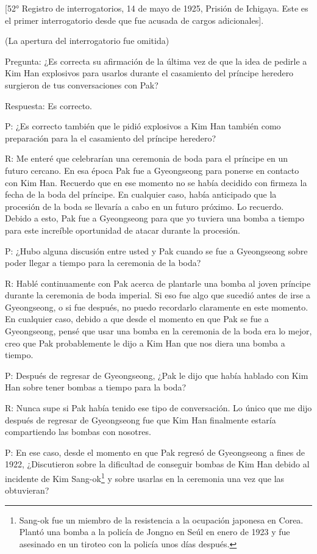 \documentclass[
]{book}
\begin{document}
{[}52° Registro de interrogatorios, 14 de mayo de 1925, Prisión de Ichigaya. Este es el primer interrogatorio desde que fue acusada de cargos adicionales{]}.

(La apertura del interrogatorio fue omitida)

Pregunta: ¿Es correcta su afirmación de la última vez de que la idea de pedirle a Kim Han explosivos para usarlos durante el casamiento del príncipe heredero surgieron de tus conversaciones con Pak?

Respuesta: Es correcto.

P: ¿Es correcto también que le pidió explosivos a Kim Han también como preparación para la el casamiento del príncipe heredero?

R: Me enteré que celebrarían una ceremonia de boda para el príncipe en un futuro cercano. En esa época Pak fue a Gyeongseong para ponerse en contacto con Kim Han. Recuerdo que en ese momento no se había decidido con firmeza la fecha de la boda del príncipe. En cualquier caso, había anticipado que la procesión de la boda se llevaría a cabo en un futuro próximo. Lo recuerdo. Debido a esto, Pak fue a Gyeongseong para que yo tuviera una bomba a tiempo para este increíble oportunidad de atacar durante la procesión.

P: ¿Hubo alguna discusión entre usted y Pak cuando se fue a Gyeongseong sobre poder llegar a tiempo para la ceremonia de la boda?

R: Hablé continuamente con Pak acerca de plantarle una bomba al joven príncipe durante la ceremonia de boda imperial. Si eso fue algo que sucedió antes de irse a Gyeongseong, o si fue después, no puedo recordarlo claramente en este momento. En cualquier caso, debido a que desde el momento en que Pak se fue a Gyeongseong, pensé que usar una bomba en la ceremonia de la boda era lo mejor, creo que Pak probablemente le dijo a Kim Han que nos diera una bomba a tiempo.

P: Después de regresar de Gyeongseong, ¿Pak le dijo que había hablado con Kim Han sobre tener bombas a tiempo para la boda?

R: Nunca supe si Pak había tenido ese tipo de conversación. Lo único que me dijo después de regresar de Gyeongseong fue que Kim Han finalmente estaría compartiendo las bombas con nosotres.

P: En ese caso, desde el momento en que Pak regresó de Gyeongseong a fines de 1922, ¿Discutieron sobre la dificultad de conseguir bombas de Kim Han debido al incidente de Kim Sang-ok\footnote{Sang-ok fue un miembro de la resistencia a la ocupación japonesa en Corea. Plantó una bomba a la policía de Jongno en Seúl en enero de 1923 y fue asesinado en un tiroteo con la policía unos días después.} y sobre usarlas en la ceremonia una vez que las obtuvieran?
\end{document}
